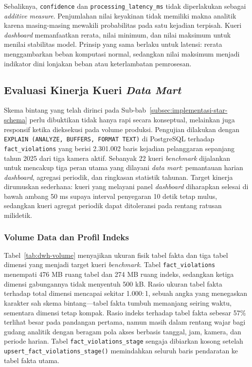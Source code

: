 Sebaliknya, \texttt{confidence} dan \texttt{processing\_latency\_ms} tidak diperlakukan sebagai \textit{additive measure}. Penjumlahan nilai keyakinan tidak memiliki makna analitik karena masing-masing mewakili probabilitas pada satu kejadian terpisah. Kueri \textit{dashboard} memanfaatkan rerata, nilai minimum, dan nilai maksimum untuk menilai stabilitas model. Prinsip yang sama berlaku untuk latensi: rerata menggambarkan beban komputasi normal, sedangkan nilai maksimum menjadi indikator dini lonjakan beban atau keterlambatan pemrosesan.


\subsection{Evaluasi Kinerja Kueri \textit{Data Mart}}
\label{subsec:evaluasi-kueri-datamart}

Skema bintang yang telah dirinci pada Sub-bab~\ref{subsec:implementasi-star-schema} perlu dibuktikan tidak hanya rapi secara konseptual, melainkan juga responsif ketika dieksekusi pada volume produksi. Pengujian dilakukan dengan \texttt{EXPLAIN (ANALYZE, BUFFERS, FORMAT TEXT)} di PostgreSQL terhadap \texttt{fact\_violations} yang berisi 2.301.002 baris kejadian pelanggaran sepanjang tahun 2025 dari tiga kamera aktif. Sebanyak 22 kueri \textit{benchmark} dijalankan untuk mencakup tiga peran utama yang dilayani \textit{data mart}: pemantauan harian \textit{dashboard}, agregasi periodik, dan ringkasan statistik tahunan. Target kinerja dirumuskan sederhana: kueri yang melayani panel \textit{dashboard} diharapkan selesai di bawah ambang 50 ms supaya interval penyegaran 10 detik tetap mulus, sedangkan kueri agregat periodik dapat ditoleransi pada rentang ratusan milidetik.

\subsubsection{Volume Data dan Profil Indeks}
\label{subsubsec:volume-indeks}

Tabel~\ref{tab:dwh-volume} menyajikan ukuran fisik tabel fakta dan tiga tabel dimensi yang menjadi target kueri \textit{benchmark}. Tabel \texttt{fact\_violations} menempati 476 MB ruang tabel dan 274 MB ruang indeks, sedangkan ketiga dimensi gabungannya tidak menyentuh 500 kB. Rasio ukuran tabel fakta terhadap total dimensi mencapai sekitar 1.000$:$1, sebuah angka yang menegaskan karakter sah skema bintang---tabel fakta tumbuh memanjang seiring waktu, sementara dimensi tetap kompak. Rasio indeks terhadap tabel fakta sebesar 57\% terlihat besar pada pandangan pertama, namun masih dalam rentang wajar bagi gudang analitik dengan beragam pola akses berbasis tanggal, jam, kamera, dan periode harian. Tabel \texttt{fact\_violations\_stage} sengaja dibiarkan kosong setelah \texttt{upsert\_fact\_violations\_stage()} memindahkan seluruh baris pendaratan ke tabel fakta utama.

